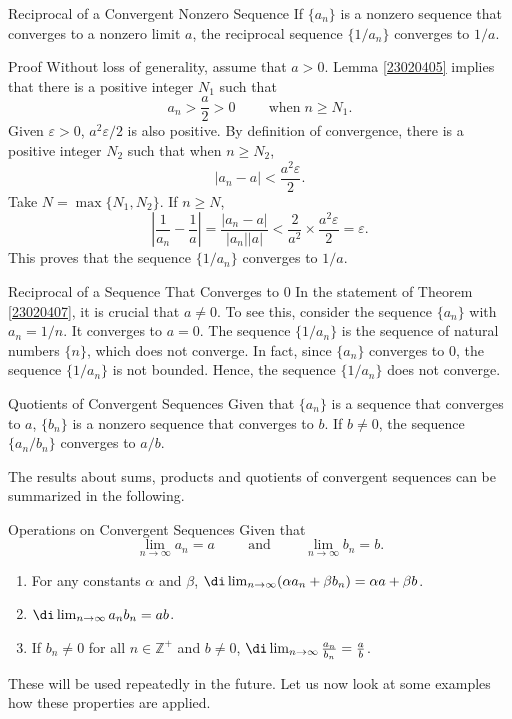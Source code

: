 \begin{theorem}[label=23020407]
{Reciprocal of a Convergent Nonzero Sequence}
If $\{a_n\}$ is a nonzero sequence that converges to a nonzero limit $a$, the reciprocal sequence $\{1/a_n\}$ converges to $1/a$.
\end{theorem}
\begin{myproof}{Proof}
Without loss of generality, assume that $a>0$. Lemma \ref{23020405} implies that there is a positive integer $N_1$ such that
\[a_n>\frac{a}{2}>0\hspace{1cm}\text{when}\;n\geq N_1.\]
Given $\varepsilon>0$, $a^2\varepsilon/2$ is also positive. By definition of convergence, there is a positive integer $N_2$ such that when $n\geq N_2$,
\[|a_n-a|<\frac{a^2\varepsilon}{2}.\]
Take $N=\max\{N_1, N_2\}$. If $n\geq N$, 
\[
\left|\frac{1}{a_n}-\frac{1}{a}\right|=\frac{|a_n-a|}{|a_n||a|}<\frac{2}{a^2}\times\frac{a^2\varepsilon}{2}= \varepsilon.\]
This proves that the  sequence $\{1/a_n\}$ converges to $1/a$.
 
\end{myproof}

\begin{remark}[label=r23020401]{Reciprocal of a Sequence That Converges to 0}
In the statement of Theorem \ref{23020407}, it is crucial that $a\neq 0$. To see this, consider the sequence $\{a_n\}$ with $a_n=1/n$. It converges to $a=0$. The sequence $\{1/a_n\}$ is the sequence of natural numbers $\{n\}$, which does not converge. In fact, since $\{a_n\}$ converges to $0$, the sequence $\{1/a_n\}$ is not bounded. Hence, the sequence $\{1/a_n\}$ does not converge.
\end{remark}

\begin{corollary}[label=23020408]{Quotients of Convergent Sequences}
Given that $\{a_n\}$ is a sequence that converges to $a$, $\{b_n\}$ is a nonzero sequence that converges to $b$. If $b\neq 0$, the sequence $\{a_n/b_n\}$ converges to $a/b$. 
\end{corollary}
The results about sums, products and quotients of convergent sequences can be summarized in the following.
\begin{highlight}{Operations on Convergent Sequences}
Given that
\[\lim_{n\rightarrow\infty}a_n=a\hspace{1cm}\text{and}\hspace{1cm}\lim_{n\rightarrow\infty}b_n=b.\]
\begin{enumerate}[1.]
\item For any constants $\alpha$ and $\beta$, 
$\di \lim_{n\rightarrow\infty}(\alpha a_n+\beta b_n)=\alpha a+\beta b$.

\item $\di\lim_{n\rightarrow \infty}a_nb_n=ab$.

\item If $b_n\neq 0$ for all $n\in\mathbb{Z}^+$ and $b\neq 0$, $\di \lim_{n\rightarrow\infty}\frac{a_n}{b_n}=\frac{a}{b}$.

\end{enumerate}
\end{highlight}
These will be used repeatedly in the future.
Let us now look at some examples how these properties are applied.

